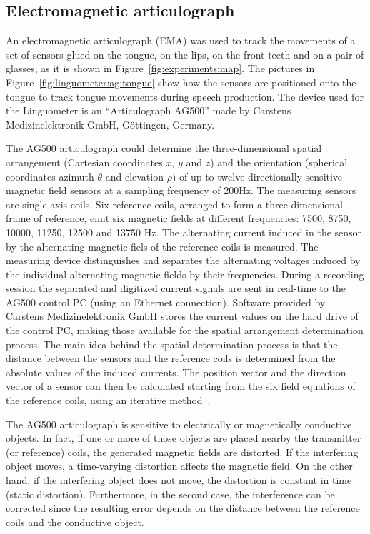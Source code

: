 \subsection{Electromagnetic articulograph}
\label{sec:linguometer:instrumentation:ag}
An electromagnetic articulograph (EMA) was used to track the movements of a set
of sensors glued on the tongue, on the lips, on the front teeth and on 
a pair of glasses, as it is shown in Figure~\ref{fig:experiments:map}.
The pictures in Figure~\ref{fig:linguometer:ag:tongue} show how the sensors are
positioned onto the tongue to track tongue movements during speech production.
The device used for the Linguometer is an ``Articulograph AG500'' made by
Carstens Medizinelektronik GmbH, G\"ottingen, Germany.

The AG500 articulograph could determine the three-dimensional spatial 
arrangement (Cartesian coordinates $x$, $y$ and $z$) and the orientation
(spherical coordinates azimuth $\theta$ and elevation $\rho$)
of up to twelve 
directionally sensitive magnetic field sensors at a sampling frequency of 200Hz.
The measuring sensors are single axis coils.
Six reference coils, arranged to form a three-dimensional frame of
reference, emit six magnetic fields at different frequencies:
7500, 8750, 10000, 11250, 12500 and 13750 Hz.
The alternating current induced in the sensor by the alternating magnetic fiels
of the reference coils is measured.
The measuring device distinguishes and separates the alternating voltages
induced by the individual alternating magnetic fields by their 
frequencies.
During a recording session the separated and digitized current signals are
sent in real-time to the AG500 control PC (using an Ethernet connection).
Software provided by Carstens Medizinelektronik GmbH stores the current values
on the hard drive of the control PC, making those available for the spatial 
arrangement determination process.
The main idea behind the spatial determination process is that the distance 
between the sensors and the reference coils is determined from the
absolute values of the induced currents. 
The position vector and the direction vector of a sensor can then be calculated
starting from the six field equations of the reference coils, using an iterative
method~\citep{zierdt.carstens:1993}.


The AG500 articulograph is sensitive to electrically or magnetically conductive
objects. 
In fact, if one or more of those objects are placed nearby the transmitter (or
reference) coils, the generated magnetic fields are distorted.
If the interfering object moves, a time-varying distortion affects the
magnetic field.
On the other hand, if the interfering object does not move, the
distortion is constant in time (static distortion). 
Furthermore, in the second case, the interference can be
corrected since the resulting error depends on the distance between the
reference coils and the conductive object.

